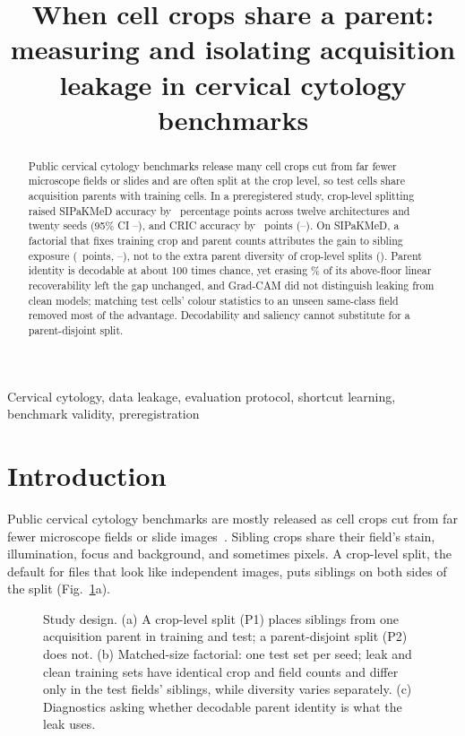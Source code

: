 \documentclass{article}
\title{When cell crops share a parent: measuring and isolating acquisition leakage in cervical cytology benchmarks}
\begin{document}
\maketitle

\begin{abstract}
Public cervical cytology benchmarks release many cell crops cut from far fewer microscope fields or slides and are often split at the crop level, so test cells share acquisition parents with training cells. In a preregistered study, crop-level splitting raised SIPaKMeD accuracy by \HoneEst\ percentage points across twelve architectures and twenty seeds (95\% CI \HoneBootLo--\HoneBootHi), and CRIC accuracy by \HtwoEst\ points (\HtwoLo--\HtwoHi). On SIPaKMeD, a factorial that fixes training crop and parent counts attributes the gain to sibling exposure (\HthreeEst\ points, \HthreeLo--\HthreeHi), not to the extra parent diversity of crop-level splits (\DivEst). Parent identity is decodable at about 100 times chance, yet erasing \LeaceAboveFloorCut\% of its above-floor linear recoverability left the gap unchanged, and Grad-CAM did not distinguish leaking from clean models; matching test cells' colour statistics to an unseen same-class field removed most of the advantage. Decodability and saliency cannot substitute for a parent-disjoint split.
\end{abstract}

\begin{keywords}
Cervical cytology, data leakage, evaluation protocol, shortcut learning, benchmark validity, preregistration
\end{keywords}

\section{Introduction}
\label{sec:intro}

Public cervical cytology benchmarks are mostly released as cell crops cut from far fewer microscope fields or slide images~\cite{plissiti2018sipakmed,liu2022cx22,rezende2021cric}. Sibling crops share their field's stain, illumination, focus and background, and sometimes pixels. A crop-level split, the default for files that look like independent images, puts siblings on both sides of the split (Fig.~\ref{fig:design}a).

\begin{figure}[t]
\centering

\caption{Study design. (a) A crop-level split (P1) places siblings from one acquisition parent in training and test; a parent-disjoint split (P2) does not. (b) Matched-size factorial: one test set per seed; leak and clean training sets have identical crop and field counts and differ only in the test fields' siblings, while diversity varies separately. (c) Diagnostics asking whether decodable parent identity is what the leak uses.}
\label{fig:design}
\end{figure}
\end{document}

